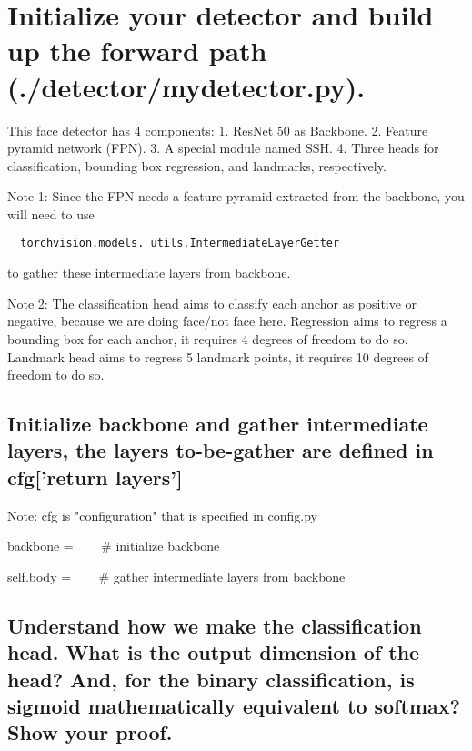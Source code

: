 \documentclass[11pt,addpoints,answers]{exam}
\begin{document}
\section{Initialize your detector and build up the forward path (./detector/mydetector.py).}

This face detector has 4 components: 1. ResNet 50 as Backbone. 2. Feature pyramid
network (FPN). 3. A special module named SSH. 4. Three heads for classification,
bounding box regression, and landmarks, respectively.

Note 1: Since the FPN needs a feature pyramid extracted from the backbone, you will need to use 
\begin{verbatim}
  torchvision.models._utils.IntermediateLayerGetter
\end{verbatim}

to gather these intermediate layers from backbone.

Note 2: The classification head aims to classify each anchor as positive or negative, because we
are doing face/not face here. Regression aims to regress a bounding box for each
anchor, it requires 4 degrees of freedom to do so. Landmark head aims to regress 5
landmark points, it requires 10 degrees of freedom to do so.

\subsection{Initialize backbone and gather intermediate layers, the layers to-be-gather are
defined in cfg['return layers']}

Note: cfg is "configuration" that is specified in config.py

\begin{solution*}{}
backbone = ~~~ \#  initialize backbone

self.body = ~~~ \# gather intermediate layers from backbone
\end{solution*}

\subsection{Understand how we make the classification head. What is the output dimension
of the head?  And, for the binary classification, is sigmoid mathematically equivalent to softmax?  Show your proof.}

\begin{solution*}{}

\end{solution*}
\end{document}
